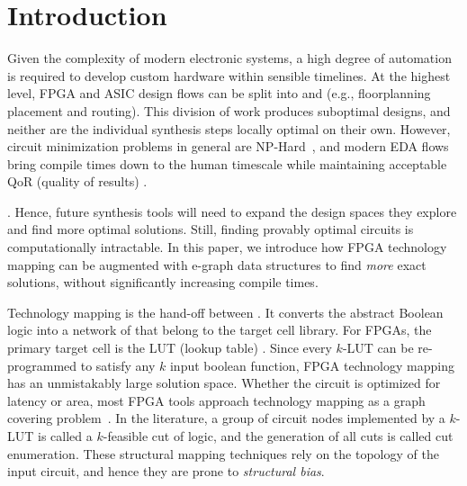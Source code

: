 \section{Introduction}\label{sec:intro}
Given the complexity of modern electronic systems, a high degree of automation
is required to develop custom hardware within sensible timelines. At the
highest level, FPGA and ASIC design flows can be split into  and  (e.g., floorplanning placement and
routing).  This
division of work produces suboptimal designs, and neither are the individual
synthesis steps locally optimal on their own. However, circuit minimization
problems in general are NP-Hard~\cite{logicmin,twolevellogic}, and modern EDA
flows bring compile times down to the human timescale while maintaining
acceptable QoR (quality of results) .

.  Hence, future synthesis tools will
need to expand the design spaces they explore and find more optimal solutions.
Still, finding provably optimal circuits is computationally intractable. In
this paper, we introduce how FPGA technology mapping can be augmented with
e-graph data structures to find \textit{more} exact solutions, without
significantly increasing compile times.

Technology mapping is the hand-off between . It converts the abstract Boolean logic into a network of
  that belong to the target cell library. For FPGAs,
the primary target cell is the LUT (lookup table) .
Since every $k$-LUT can be re-programmed to satisfy any $k$ input boolean
function, FPGA technology mapping has an unmistakably large solution space.
Whether the circuit is optimized for latency or area, most FPGA tools approach
technology mapping as a graph covering problem~\cite{flowmap, daomap, attmap,
    imap}. In the literature, a group of circuit nodes implemented by a $k$-LUT is
called a $k$-feasible cut of logic, and the generation of all cuts is called
cut enumeration. These structural mapping techniques rely on the topology of
the input circuit, and hence they are prone to \textit{structural bias}.

